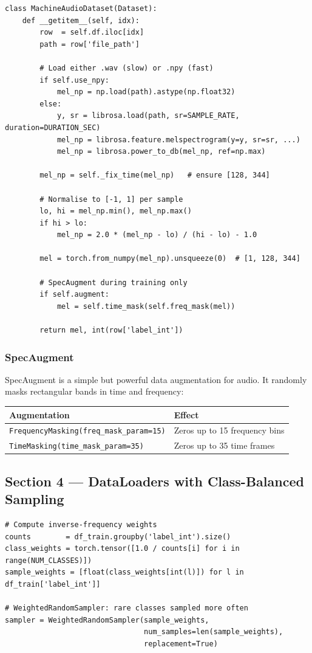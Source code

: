 \documentclass[12pt,a4paper]{article}
\begin{document}
\begin{lstlisting}
class MachineAudioDataset(Dataset):
    def __getitem__(self, idx):
        row  = self.df.iloc[idx]
        path = row['file_path']

        # Load either .wav (slow) or .npy (fast)
        if self.use_npy:
            mel_np = np.load(path).astype(np.float32)
        else:
            y, sr = librosa.load(path, sr=SAMPLE_RATE, duration=DURATION_SEC)
            mel_np = librosa.feature.melspectrogram(y=y, sr=sr, ...)
            mel_np = librosa.power_to_db(mel_np, ref=np.max)

        mel_np = self._fix_time(mel_np)   # ensure [128, 344]

        # Normalise to [-1, 1] per sample
        lo, hi = mel_np.min(), mel_np.max()
        if hi > lo:
            mel_np = 2.0 * (mel_np - lo) / (hi - lo) - 1.0

        mel = torch.from_numpy(mel_np).unsqueeze(0)  # [1, 128, 344]

        # SpecAugment during training only
        if self.augment:
            mel = self.time_mask(self.freq_mask(mel))

        return mel, int(row['label_int'])
\end{lstlisting}

\subsubsection{SpecAugment}
SpecAugment is a simple but powerful data augmentation for audio. It randomly masks rectangular bands in time and frequency:

\begin{center}
\begin{tabular}{ll}
\toprule
\textbf{Augmentation} & \textbf{Effect} \\
\midrule
\texttt{FrequencyMasking(freq\_mask\_param=15)} & Zeros up to 15 frequency bins \\
\texttt{TimeMasking(time\_mask\_param=35)} & Zeros up to 35 time frames \\
\bottomrule
\end{tabular}
\end{center}

\subsection{Section 4 --- DataLoaders with Class-Balanced Sampling}

\begin{lstlisting}
# Compute inverse-frequency weights
counts        = df_train.groupby('label_int').size()
class_weights = torch.tensor([1.0 / counts[i] for i in range(NUM_CLASSES)])
sample_weights = [float(class_weights[int(l)]) for l in df_train['label_int']]

# WeightedRandomSampler: rare classes sampled more often
sampler = WeightedRandomSampler(sample_weights,
                                num_samples=len(sample_weights),
                                replacement=True)
\end{lstlisting}
\end{document}
